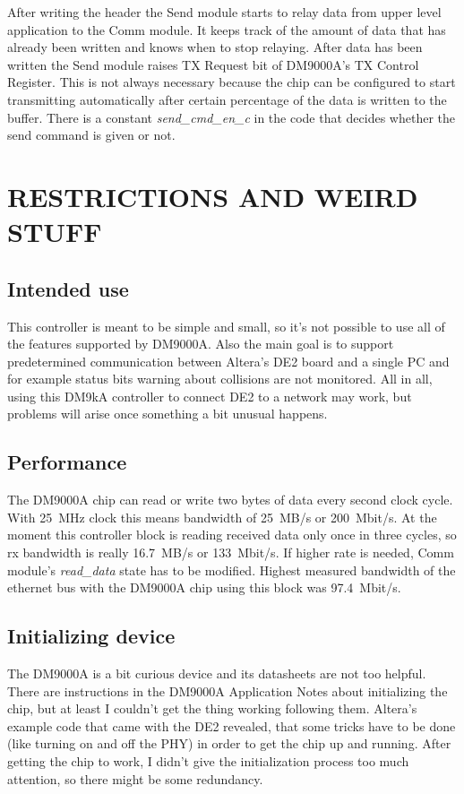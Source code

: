 \documentclass{article}
\begin{document}
After writing the header the Send module starts to relay data from
upper level application to the Comm module. It keeps track of the
amount of data that has already been written and knows when to stop
relaying. After data has been written the Send module raises TX
Request bit of DM9000A's TX Control Register. This is not always
necessary because the chip can be configured to start transmitting
automatically after certain percentage of the data is written to the
buffer. There is a constant \emph{send\_cmd\_en\_c} in the code that
decides whether the send command is given or not.


\newpage
\section{RESTRICTIONS AND WEIRD STUFF}

\subsection{Intended use}

This controller is meant to be simple and small, so it's not possible
to use all of the features supported by DM9000A. Also the main
goal is to support predetermined communication between Altera's DE2
board and a single PC and for example status bits warning about
collisions are not monitored.  All in all, using this DM9kA controller
to connect DE2 to a network may work, but problems will arise once
something a bit unusual happens.


\subsection{Performance}

The DM9000A chip can read or write two bytes of data every second
clock cycle. With 25~MHz clock this means bandwidth of 25~MB/s or
200~Mbit/s. At the moment this controller block is reading received
data only once in three cycles, so rx bandwidth is really 16.7~MB/s or
133~Mbit/s. If higher rate is needed, Comm module's
\textit{read\_data} state has to be modified. Highest measured
bandwidth of the ethernet bus with the DM9000A chip using this block
was 97.4~Mbit/s.


\subsection{Initializing device}

The DM9000A is a bit curious device and its datasheets are not too
helpful. There are instructions in the DM9000A Application Notes about
initializing the chip, but at least I couldn't get the thing working
following them. Altera's example code that came with the DE2 revealed,
that some tricks have to be done (like turning on and off the PHY) in
order to get the chip up and running. After getting the chip to work,
I didn't give the initialization process too much attention, so there
might be some redundancy.
\end{document}
